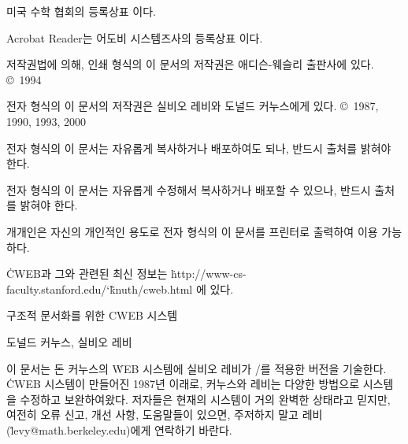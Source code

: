 \noindent
{} 미국 수학 협회의 등록상표 이다.

\noindent
Acrobat Reader는 어도비 시스템즈사의 등록상표 이다.

\bigskip\noindent
저작권법에 의해, 인쇄 형식의 이 문서의 저작권은 애디슨-웨슬리 출판사에
있다.  \copyright\ 1994 

\smallskip\noindent
전자 형식의 이 문서의 저작권은 실비오 레비와 도널드 커누스에게
있다. \copyright\ 1987, 1990, 1993, 2000 

\bigskip\noindent
전자 형식의 이 문서는 자유롭게 복사하거나 배포하여도 되나, 반드시
출처를 밝혀야 한다.

\smallskip\noindent
전자 형식의 이 문서는 자유롭게 수정해서 복사하거나 배포할 수 있으나, 반드시
출처를 밝혀야 한다.

\smallskip\noindent
개개인은 자신의 개인적인 용도로 전자 형식의 이 문서를 프린터로
출력하여 이용 가능하다.

\smallskip\noindent
\.{CWEB}과 그와 관련된 최신 정보는 
\.{http://www-cs-faculty.stanford.edu/\char`\~knuth/cweb.html}
에 있다.

 \titletrue\eject

\baselineskip=15pt

\titletrue
\centerline{\titlefont 구조적 문서화를 위한 {\ttitlefont CWEB} 시스템}

\centerline{\hfontsize{11pt}도널드 커누스, 실비오 레비}

\noindent
이 문서는 돈 커누스의 \.{WEB} 시스템에 실비오 레비가 \CEE/를
적용한 버전을 기술한다. \.{CWEB} 시스템이 만들어진 1987년 이래로, 
커누스와 레비는 다양한 방법으로 시스템을 수정하고 보완하여왔다. 
저자들은 현재의 시스템이 거의 완벽한 상태라고 믿지만, 
여전히 오류 신고, 개선 사항, 도움말들이 있으면,
주저하지 말고 레비(\.{levy@math.berkeley.edu})에게 연락하기 바란다.

